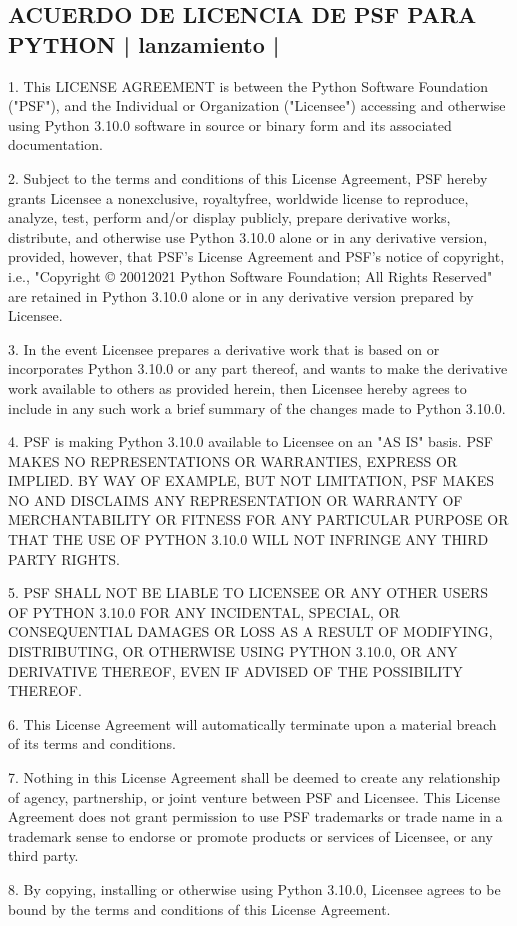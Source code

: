 \documentclass[a4,10pt,spanish]{sphinxmanual}
\begin{document}
\subsection{ACUERDO DE LICENCIA DE PSF PARA PYTHON | lanzamiento |}
\label{\detokenize{license:psf-license-agreement-for-python-release}}\label{\detokenize{license:psf-license}}\begin{sphinxalltt}
1. This LICENSE AGREEMENT is between the Python Software Foundation ("PSF"), and
   the Individual or Organization ("Licensee") accessing and otherwise using Python
   3.10.0 software in source or binary form and its associated documentation.

2. Subject to the terms and conditions of this License Agreement, PSF hereby
   grants Licensee a nonexclusive, royalty\sphinxhyphen{}free, world\sphinxhyphen{}wide license to reproduce,
   analyze, test, perform and/or display publicly, prepare derivative works,
   distribute, and otherwise use Python 3.10.0 alone or in any derivative
   version, provided, however, that PSF's License Agreement and PSF's notice of
   copyright, i.e., "Copyright © 2001\sphinxhyphen{}2021 Python Software Foundation; All Rights
   Reserved" are retained in Python 3.10.0 alone or in any derivative version
   prepared by Licensee.

3. In the event Licensee prepares a derivative work that is based on or
   incorporates Python 3.10.0 or any part thereof, and wants to make the
   derivative work available to others as provided herein, then Licensee hereby
   agrees to include in any such work a brief summary of the changes made to Python
   3.10.0.

4. PSF is making Python 3.10.0 available to Licensee on an "AS IS" basis.
   PSF MAKES NO REPRESENTATIONS OR WARRANTIES, EXPRESS OR IMPLIED.  BY WAY OF
   EXAMPLE, BUT NOT LIMITATION, PSF MAKES NO AND DISCLAIMS ANY REPRESENTATION OR
   WARRANTY OF MERCHANTABILITY OR FITNESS FOR ANY PARTICULAR PURPOSE OR THAT THE
   USE OF PYTHON 3.10.0 WILL NOT INFRINGE ANY THIRD PARTY RIGHTS.

5. PSF SHALL NOT BE LIABLE TO LICENSEE OR ANY OTHER USERS OF PYTHON 3.10.0
   FOR ANY INCIDENTAL, SPECIAL, OR CONSEQUENTIAL DAMAGES OR LOSS AS A RESULT OF
   MODIFYING, DISTRIBUTING, OR OTHERWISE USING PYTHON 3.10.0, OR ANY DERIVATIVE
   THEREOF, EVEN IF ADVISED OF THE POSSIBILITY THEREOF.

6. This License Agreement will automatically terminate upon a material breach of
   its terms and conditions.

7. Nothing in this License Agreement shall be deemed to create any relationship
   of agency, partnership, or joint venture between PSF and Licensee.  This License
   Agreement does not grant permission to use PSF trademarks or trade name in a
   trademark sense to endorse or promote products or services of Licensee, or any
   third party.

8. By copying, installing or otherwise using Python 3.10.0, Licensee agrees
   to be bound by the terms and conditions of this License Agreement.
\end{sphinxalltt}
\end{document}
